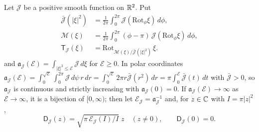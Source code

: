 \begin{definition}\label{def:str-normalisation}
Let $\mathcal J$ be a positive smooth function on $\mathbb{R}^2$. Put
\begin{align*}
 \bar{\mathcal J}(|\xi|^2)&=\frac1{2\pi}\int_0^{2\pi}\mathcal J(\mathrm{Rot}_\phi\xi)\,d\phi,\\
 \mathcal M(\xi)&=\frac1{2\pi}\int_0^{2\pi}(\phi-\pi)\,\mathcal J(\mathrm{Rot}_\phi\xi)\,d\phi,\\
 \mathsf T_{\mathcal J}(\xi)&=\mathrm{Rot}_{\mathcal M(\xi)/\bar{\mathcal J}(|\xi|^2)}\,\xi .
\end{align*}
and $\mathfrak a_{\mathcal J}(\mathcal E)=\int_{|\xi|^2\le\mathcal E}\mathcal J\,d\xi$ for $\mathcal E\ge0$. In polar coordinates
$\mathfrak a_{\mathcal J}(\mathcal E)=\int_0^{\sqrt{\mathcal E}}\int_0^{2\pi}\mathcal J\,d\psi\,r\,dr
=\int_0^{\sqrt{\mathcal E}}2\pi r\bar{\mathcal J}(r^2)\,dr=\pi\int_0^{\mathcal E}\bar{\mathcal J}(t)\,dt$ with $\bar{\mathcal J}>0$, so
$\mathfrak a_{\mathcal J}$ is continuous and strictly increasing with $\mathfrak a_{\mathcal J}(0)=0$. If
$\mathfrak a_{\mathcal J}(\mathcal E)\to\infty$ as $\mathcal E\to\infty$, it is a bijection of $[0,\infty)$; then let
$\mathcal E_{\mathcal J}=\mathfrak a_{\mathcal J}^{-1}$ and, for $z\in\mathbb{C}$ with $I=\pi|z|^2$,
\[
 \mathsf D_{\mathcal J}(z)=\sqrt{\pi\,\mathcal E_{\mathcal J}(I)/I}\;z\quad(z\ne0),\qquad \mathsf D_{\mathcal J}(0)=0 .
\]
\end{definition}

